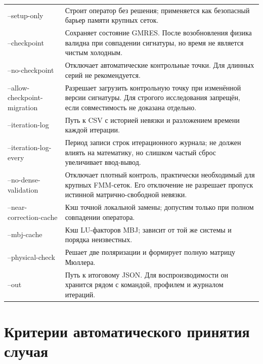 \documentclass[12pt,a4paper]{article}
\begin{document}
\begin{longtable}{>{\ttfamily\raggedright\arraybackslash}p{}p{}}
--setup-only & Строит оператор без решения; применяется как безопасный барьер памяти крупных сеток.\\
--checkpoint & Сохраняет состояние GMRES. После возобновления физика валидна при совпадении сигнатуры, но время не является чистым холодным.\\
--no-checkpoint & Отключает автоматические контрольные точки. Для длинных серий не рекомендуется.\\
--allow-checkpoint-\allowbreak migration & Разрешает загрузить контрольную точку при изменённой версии сигнатуры. Для строгого исследования запрещён, если совместимость не доказана отдельно.\\
--iteration-log & Путь к CSV с историей невязки и разложением времени каждой итерации.\\
--iteration-log-every & Период записи строк итерационного журнала; не должен влиять на математику, но слишком частый сброс увеличивает ввод-вывод.\\
--no-dense-validation & Отключает плотный контроль, практически необходимый для крупных FMM-сеток. Его отключение не разрешает пропуск истинной матрично-свободной невязки.\\
--near-\allowbreak correction-\allowbreak cache & Кэш точной локальной замены; допустим только при полном совпадении оператора.\\
--mbj-cache & Кэш LU-факторов MBJ; зависит от той же системы и порядка неизвестных.\\
--physical-check & Решает две поляризации и формирует полную матрицу Мюллера.\\
--out & Путь к итоговому JSON. Для воспроизводимости он хранится рядом с командой, профилем и журналом итераций.\\
\bottomrule
\end{longtable}
\normalsize

\section{Критерии автоматического принятия случая}
\end{document}
